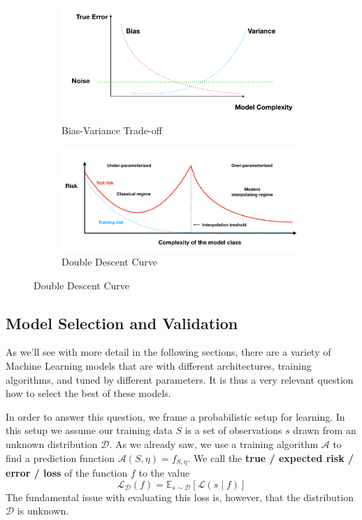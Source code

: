 \documentclass{article}
\newcommand{\E}{\mathbb{E}}
\newcommand{\loss}{\mathcal{L}}
\newcommand{\dist}{\mathcal{D}}
\begin{document}
\begin{figure}[h]
    \centering
    \begin{subfigure}{.5\textwidth}
	\centering
	\includegraphics[width=.9\linewidth]{figures/bias-variance-tradeoff.png}
	\caption{Bias-Variance Trade-off}
	\label{fig:bias-variance-tradeoff}
    \end{subfigure}%
    \begin{subfigure}{.5\textwidth}
	\centering
	\includegraphics[width=.9\linewidth]{figures/double-descent-curve.png}
	\caption{Double Descent Curve}
	\label{fig:double-descent-curve}
    \end{subfigure}
\end{figure}


\subsection{Model Selection and Validation}

As we'll see with more detail in the following sections, there are a variety of Machine Learning models that are with different architectures, training algorithms, and tuned by different parameters.
It is thus a very relevant question how to select the best of these models.

In order to answer this question, we frame a probabilistic setup for learning.
In this setup we assume our training data $S$ is a set of observations $s$ drawn from an unknown distribution $\dist$.
As we already saw, we use a training algorithm $\mathcal{A}$ to find a prediction function $\mathcal{A}(S, \eta) = f_{S, \eta}$.
We call the \textbf{true / expected risk / error / loss} of the function $f$ to the value
$$
\loss_\dist(f) = \E_{s \sim \dist} \left[ \loss(s \mid f) \right]
$$
The fundamental issue with evaluating this loss is, however, that the distribution $\dist$ is unknown.
\end{document}
